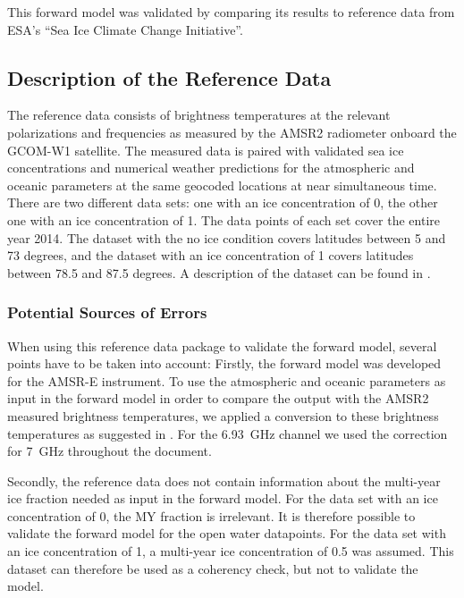 \documentclass[11pt, a4paper]{article}
\begin{document}
This forward model was validated by comparing its results to reference data from ESA's ``Sea Ice Climate Change Initiative''.


\subsection{Description of the Reference Data}

The reference data consists of brightness temperatures at the relevant polarizations and frequencies as measured by the AMSR2 radiometer onboard the GCOM-W1 satellite. The measured data is paired with validated sea ice concentrations and numerical weather predictions for the atmospheric and oceanic parameters at the same geocoded locations at near simultaneous time. There are two different data sets: one with an ice concentration of 0, the other one with an ice concentration of 1. The data points of each set cover the entire year 2014. The dataset with the no ice condition covers latitudes between 5 and 73 degrees, and the dataset with an ice concentration of 1 covers latitudes between 78.5 and 87.5 degrees. A description of the dataset can be found in \cite{Wink2}.

\subsubsection{Potential Sources of Errors}
\label{sec:RefDat}
When using this reference data package to validate the forward model, several points have to be taken into account: Firstly, the forward model was developed for the AMSR-E instrument. To use the atmospheric and oceanic parameters as input in the forward model in order to compare the output with the AMSR2 measured brightness temperatures, we applied a conversion to these brightness temperatures as suggested in \cite{secret}. For the \SI{6.93}{GHz} channel we used the correction for \SI{7}{GHz} throughout the document.
\newline

Secondly, the reference data does not contain information about the multi-year ice fraction needed as input in the forward model. For the data set with an ice concentration of 0, the MY fraction is irrelevant. It is therefore possible to validate the forward model for the open water datapoints. For the data set with an ice concentration of 1, a multi-year ice concentration of 0.5 was assumed. This dataset can therefore be used as a coherency check, but not to validate the model.
\newline
\end{document}

